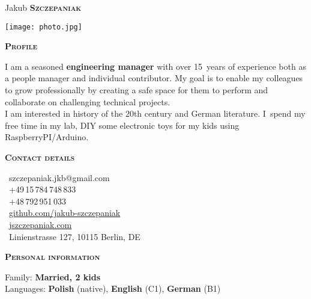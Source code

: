 \documentclass[11pt, a4paper]{article}
\newcommand{\headleft}[1]{\vspace*{3ex}\textsc{\textbf{#1}}\par%
    \vspace*{-1.5ex}\hrulefill\par\vspace*{0.7ex}}
\begin{document}
\setlength{\topskip}{0pt}
\setlength{\parindent}{0pt}
\setlength{\parskip}{0pt}
\setlength{\fboxsep}{0pt}
\pagestyle{empty}
\raggedbottom

\begin{minipage}[t]{0.33\textwidth} %
\colorbox{cvblue}{\begin{minipage}[t][5mm][t]{\textwidth}\null\hfill\null\end{minipage}}

\vspace{-.2ex} %
\colorbox{cvblue!90}{\color{white}  %
\textwidth\relax%
\begin{minipage}[t][293mm][t]{0.82\textwidth}
\raggedright
\vspace*{2.5ex}

\Large Jakub \textbf{\textsc{Szczepaniak}} \normalsize 

\null\hfill\texttt{[image: photo.jpg]}\hfill\null

\vspace*{0.5ex} %

\headleft{Profile}
I am a seasoned \textbf{engineering manager} with over 15~years of experience both as a people manager and individual contributor.
My goal is to enable my colleagues to grow professionally by creating a safe space for them to perform and collaborate on challenging technical projects.\\
I am interested in history of the 20th century and German literature.
I~spend my free time in my lab, DIY some electronic toys for my kids using RaspberryPI/Arduino.

\headleft{Contact details}
\small %
\MVAt\ {\small szczepaniak.jkb@gmail.com} \\[0.4ex]
\Mobilefone\ +49\,15\,784\,748\,833 \\[0.5ex]
\Mobilefone\ +48\,792\,951\,033 \\[0.5ex]
\Mundus\ \href{https://github.com/jakub-szczepaniak}{github.com/jakub-szczepaniak} \\[0.1ex]
\Mundus\ \href{https://jszczepaniak.com}{jszczepaniak.com} \\[0.1ex]
\Letter\ Linienstrasse 127, 10115 Berlin, DE
\normalsize

\headleft{Personal information}
Family: \textbf{Married, 2 kids} \\[0.5ex]
Languages: \textbf{Polish} (native), \textbf{English} (C1), \textbf{German} (B1)


\end{minipage}}
\end{minipage}
\end{document}
